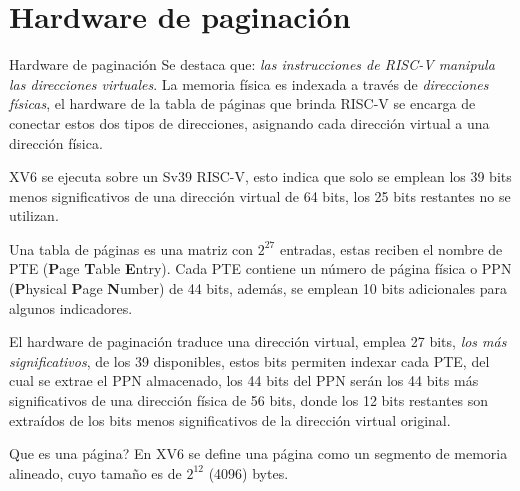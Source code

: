 \documentclass{libs/ufc_format}
\begin{document}
\section{Hardware de paginación}
\begin{frame}{Hardware de paginación}
  Se destaca que: \emph{las instrucciones de RISC-V manipula las direcciones virtuales}. La memoria física es indexada a través de \emph{direcciones físicas}, el hardware de la tabla de páginas que brinda RISC-V se encarga de conectar estos dos tipos de direcciones, asignando cada dirección virtual a una dirección física.

  \vspace{0.3cm}

  XV6 se ejecuta sobre un Sv39 RISC-V, esto indica que solo se emplean los 39 bits menos significativos de una dirección virtual de 64 bits, los 25 bits restantes no se utilizan.
\end{frame}
\begin{frame}{}
  Una tabla de páginas  es una matriz con $2^{27}$ entradas, estas reciben el nombre de PTE (\textbf{P}age \textbf{T}able \textbf{E}ntry). Cada PTE contiene un número de página física o PPN (\textbf{P}hysical \textbf{P}age \textbf{N}umber) de 44 bits, además, se emplean 10 bits adicionales para algunos indicadores.

  \vspace{0.3cm}

  El hardware de paginación traduce una dirección virtual, emplea 27 bits, \emph{los más significativos}, de los 39 disponibles, estos bits permiten indexar cada PTE, del cual se extrae el PPN almacenado, los 44 bits del PPN serán los 44 bits más significativos de una dirección física de 56 bits, donde los 12 bits restantes son extraídos de los bits menos significativos de la dirección virtual original.

  \begin{block}{Que es una página?}
    En XV6 se define una página como un segmento de memoria alineado, cuyo tamaño es de $2^{12}$ (4096) bytes. \cite{xv6_book}
  \end{block}
\end{frame}
\end{document}
